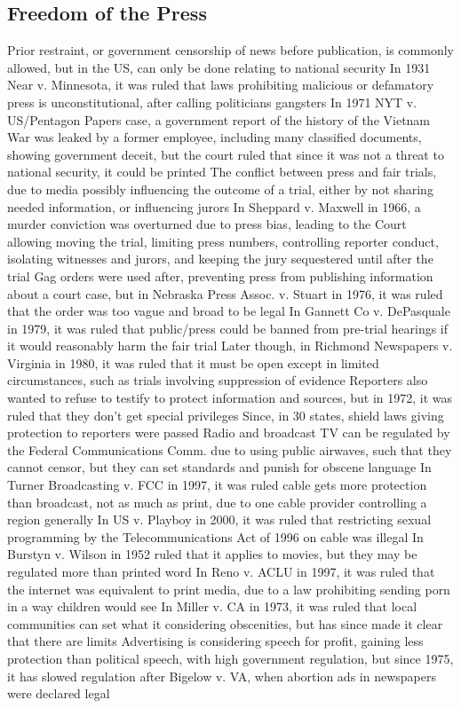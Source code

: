 \documentclass[11 pt, twoside]{article}
\newenvironment{outline*}
{
	\begin{outline}[enumerate]
	}
	{\end{outline}
}
\begin{document}
\subsection{Freedom of the Press}
\begin{outline*}
\1 Prior restraint, or government censorship of news before publication, is commonly allowed, but in the US, can only be done relating to national security
\2 In 1931 Near v. Minnesota, it was ruled that laws prohibiting malicious or defamatory press is unconstitutional, after calling politicians gangsters
\2 In 1971 NYT v. US/Pentagon Papers case, a government report of the history of the Vietnam War was leaked by a former employee, including many classified documents, showing government deceit, but the court ruled that since it was not a threat to national security, it could be printed
\1 The conflict between press and fair trials, due to media possibly influencing the outcome of a trial, either by not sharing needed information, or influencing jurors
\2 In Sheppard v. Maxwell in 1966, a murder conviction was overturned due to press bias, leading to the Court allowing moving the trial, limiting press numbers, controlling reporter conduct, isolating witnesses and jurors, and keeping the jury sequestered until after the trial
\2 Gag orders were used after, preventing press from publishing information about a court case, but in Nebraska Press Assoc. v. Stuart in 1976, it was ruled that the order was too vague and broad to be legal
\2 In Gannett Co v. DePasquale in 1979, it was ruled that public/press could be banned from pre-trial hearings if it would reasonably harm the fair trial
\2 Later though, in Richmond Newspapers v. Virginia in 1980, it was ruled that it must be open except in limited circumstances, such as trials involving suppression of evidence
\2 Reporters also wanted to refuse to testify to protect information and sources, but in 1972, it was ruled that they don’t get special privileges
\2 Since, in 30 states, shield laws giving protection to reporters were passed
\1 Radio and broadcast TV can be regulated by the Federal Communications Comm. due to using public airwaves, such that they cannot censor, but they can set standards and punish for obscene language
\2 In Turner Broadcasting v. FCC in 1997, it was ruled cable gets more protection than broadcast, not as much as print, due to one cable provider controlling a region generally
\2 In US v. Playboy in 2000, it was ruled that restricting sexual programming by the Telecommunications Act of 1996 on cable was illegal
\1 In Burstyn v. Wilson in 1952 ruled that it applies to movies, but they may be regulated more than printed word
\1 In Reno v. ACLU in 1997, it was ruled that the internet was equivalent to print media, due to a law prohibiting sending porn in a way children would see
\1 In Miller v. CA in 1973, it was ruled that local communities can set what it considering obscenities, but has since made it clear that there are limits
\1 Advertising is considering speech for profit, gaining less protection than political speech, with high government regulation, but since 1975, it has slowed regulation after Bigelow v. VA, when abortion ads in newspapers were declared legal
\end{outline*}
\end{document}
